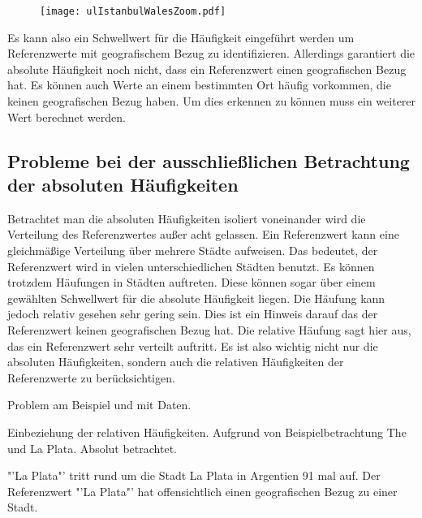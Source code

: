 				\begin{figure}[!ht]
						\begin{center}
							\texttt{[image: ulIstanbulWalesZoom.pdf]}
							\caption{}
							\label{img:ulIstanbulWalesZoom}
						\end{center}
				\end{figure}	

				Es kann also ein Schwellwert für die Häufigkeit eingeführt werden um Referenzwerte mit geografischem Bezug zu identifizieren.
				Allerdings garantiert die absolute Häufigkeit noch nicht, dass ein Referenzwert einen geografischen Bezug hat. 
				Es können auch Werte an einem bestimmten Ort häufig vorkommen, die keinen geografischen Bezug haben.
				Um dies erkennen zu können muss ein weiterer Wert berechnet werden.

		\subsection{Probleme bei der ausschließlichen Betrachtung der absoluten Häufigkeiten} 

			Betrachtet man die absoluten Häufigkeiten isoliert voneinander wird die Verteilung des Referenzwertes außer acht gelassen. 
			Ein Referenzwert kann eine gleichmäßige Verteilung über mehrere Städte aufweisen.
			Das bedeutet, der Referenzwert wird in vielen unterschiedlichen Städten benutzt. 
			Es können trotzdem Häufungen in Städten auftreten.
			Diese können sogar über einem gewählten Schwellwert für die absolute Häufigkeit liegen.
			Die Häufung kann jedoch relativ gesehen sehr gering sein.
			Dies ist ein Hinweis darauf das der Referenzwert keinen geografischen Bezug hat.
			Die relative Häufung sagt hier aus, das ein Referenzwert sehr verteilt auftritt. 
			Es ist also wichtig nicht nur die absoluten Häufigkeiten, sondern auch die relativen Häufigkeiten der Referenzwerte zu berücksichtigen.

			Problem am Beispiel und mit Daten.

			Einbeziehung der relativen Häufigkeiten. 
			Aufgrund von Beispielbetrachtung The und La Plata. Absolut betrachtet.


			"'La Plata"' tritt rund um die Stadt La Plata in Argentien 91 mal auf.
			Der Referenzwert "'La Plata"' hat offensichtlich einen geografischen Bezug zu einer Stadt. 


